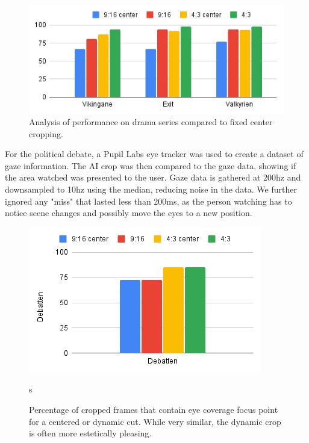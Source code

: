 \documentclass[sigconf, review=false]{acmart}
\begin{document}
\begin{figure}
\begin{center}
\includegraphics[width=0.9\columnwidth]{generic_ai_comparison.png}
\caption{Analysis of performance on drama series compared to fixed center
 cropping.}
\label{generic_ai_comparison}
\end{center}
\end{figure}

For the political debate, a Pupil Labs eye tracker was used to create a
dataset of gaze information. The AI crop was then compared to the gaze data,
showing if the area watched was presented to the user. Gaze data is gathered
at 200hz and downsampled to 10hz using the median, reducing noise in the
data. We further ignored any "miss" that lasted less than 200ms, as the
person watching has to notice scene changes and possibly move the eyes to a
new position. 

\begin{figure}
\begin{center}
\includegraphics[width=1\columnwidth]{CoverageOfEyeTracking.png}
\caption{Percentage of cropped frames that contain eye coverage focus point
 for a centered or dynamic cut. While very similar, the dynamic crop is often
 more estetically pleasing.}s
\label{debatten_plot}
 \end{center}
\end{figure}
\end{document}

